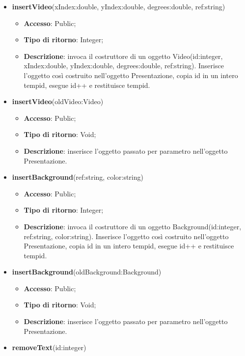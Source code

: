 {{\begin{itemize}
\begin{itemize}
				\item \textbf{Descrizione}: inserisce l’oggetto passato per parametro nell’oggetto Presentazione.
			\end{itemize}
			\item \textbf{insertVideo}(xIndex:double, yIndex:double, degrees:double, ref:string)
			\begin{itemize}
				\item \textbf{Accesso}: Public;
				\item \textbf{Tipo di ritorno}: Integer;
				\item \textbf{Descrizione}: invoca il costruttore di un oggetto Video(id:integer, xIndex:double, yIndex:double, degrees:double, ref:string). Inserisce l’oggetto così costruito nell’oggetto Presentazione, copia id in un intero tempid, esegue id++ e restituisce tempid.
			\end{itemize}
			\item \textbf{insertVideo}(oldVideo:Video)
			\begin{itemize}
				\item \textbf{Accesso}: Public;
				\item \textbf{Tipo di ritorno}: Void;
				\item \textbf{Descrizione}: inserisce l’oggetto passato per parametro nell’oggetto Presentazione.
			\end{itemize}
			\item \textbf{insertBackground}(ref:string, color:string)
			\begin{itemize}
				\item \textbf{Accesso}: Public;
				\item \textbf{Tipo di ritorno}: Integer;
				\item \textbf{Descrizione}: invoca il costruttore di un oggetto Background(id:integer, ref:string, color:string). Inserisce l’oggetto così costruito nell’oggetto Presentazione, copia id in un intero tempid, esegue id++ e restituisce tempid.
			\end{itemize}
			\item \textbf{insertBackground}(oldBackground:Background)
			\begin{itemize}
				\item \textbf{Accesso}: Public;
				\item \textbf{Tipo di ritorno}: Void;
				\item \textbf{Descrizione}: inserisce l’oggetto passato per parametro nell’oggetto Presentazione.
			\end{itemize}
			\item \textbf{removeText}(id:integer)

\end{itemize}}}
